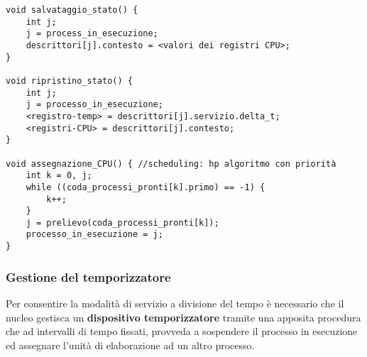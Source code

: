 \begin{verbatim}
void salvataggio_stato() {
    int j;
    j = process_in_esecuzione;
    descrittori[j].contesto = <valori dei registri CPU>;
}

void ripristino_stato() {
    int j;
    j = processo_in_esecuzione;
    <registro-temp> = descrittori[j].servizio.delta_t;
    <registri-CPU> = descrittori[j].contesto;
}

void assegnazione_CPU() { //scheduling: hp algoritmo con priorità
    int k = 0, j;
    while ((coda_processi_pronti[k].primo) == -1) {
        k++;
    }
    j = prelievo(coda_processi_pronti[k]);
    processo_in_esecuzione = j;
}
\end{verbatim}

\subsubsection{Gestione del temporizzatore}
Per consentire la modalità di servizio a divisione del tempo è necessario che il nucleo gestisca un \textbf{dispositivo temporizzatore} tramite una apposita procedura che ad intervalli di tempo fissati, provveda a sospendere il processo in esecuzione ed assegnare l'unità di elaborazione ad un altro processo.


























































